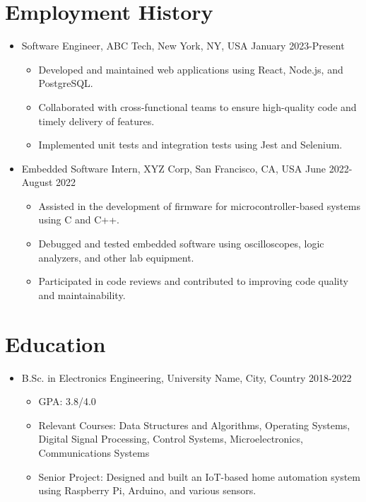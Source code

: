 \documentclass[a4paper,12pt]{article} %
\begin{document}
\section*{Employment History}
\begin{itemize}[leftmargin=*]
    \item Software Engineer, ABC Tech, New York, NY, USA \hfill January 2023-Present
          \begin{itemize}
              \item Developed and maintained web applications using React, Node.js, and PostgreSQL.
              \item Collaborated with cross-functional teams to ensure high-quality code and timely delivery of features.
              \item Implemented unit tests and integration tests using Jest and Selenium.
          \end{itemize}
    \item Embedded Software Intern, XYZ Corp, San Francisco, CA, USA \hfill June 2022-August 2022
          \begin{itemize}
              \item Assisted in the development of firmware for microcontroller-based systems using C and C++.
              \item Debugged and tested embedded software using oscilloscopes, logic analyzers, and other lab equipment.
              \item Participated in code reviews and contributed to improving code quality and maintainability.
          \end{itemize}
\end{itemize}

\section*{Education}
\begin{itemize}[leftmargin=*]
    \item B.Sc. in Electronics Engineering, University Name, City, Country \hfill 2018-2022
          \begin{itemize}
              \item GPA: 3.8/4.0
              \item Relevant Courses: Data Structures and Algorithms, Operating Systems, Digital Signal Processing, Control Systems, Microelectronics, Communications Systems
              \item Senior Project: Designed and built an IoT-based home automation system using Raspberry Pi, Arduino, and various sensors.
          \end{itemize}
\end{itemize}
\end{document}
